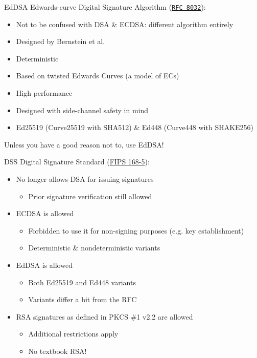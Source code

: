 \begin{frame}{EdDSA}
  Edwards-curve Digital Signature Algorithm (\href{https://datatracker.ietf.org/doc/html/rfc8032}{\texttt{RFC 8032}}):
  \begin{itemize}[<+(1)->]
    \item Not to be confused with DSA \& ECDSA: different algorithm entirely
    \item Designed by \alert{Bernstein} et al.
    \item Deterministic
    \item Based on twisted Edwards Curves (a model of ECs)
    \item High performance
    \item Designed with side-channel safety in mind
    \item Ed25519 (Curve25519 with SHA512) \& Ed448 (Curve448 with SHAKE256)
  \end{itemize}

  \pause
  Unless you have a good reason not to, use EdDSA!
\end{frame}

\begin{frame}{DSS}
  Digital Signature Standard (\href{https://csrc.nist.gov/pubs/fips/186-5/final}{FIPS 168-5}):
  \begin{itemize}[<+(1)->]
    \item No longer allows DSA for issuing signatures
    \begin{itemize}
      \item Prior signature verification still allowed
    \end{itemize}
    \item ECDSA is allowed
    \begin{itemize}
      \item Forbidden to use it for non-signing purposes (e.g. key establishment)
      \item Deterministic \& nondeterministic variants
    \end{itemize}
    \item EdDSA is allowed
    \begin{itemize}
      \item Both Ed25519 and Ed448 variants
      \item Variants differ a bit from the RFC
    \end{itemize}
    \item RSA signatures as defined in PKCS \#1 v2.2 are allowed
    \begin{itemize}
      \item Additional restrictions apply
      \item No textbook RSA!
    \end{itemize}
  \end{itemize}
\end{frame}

